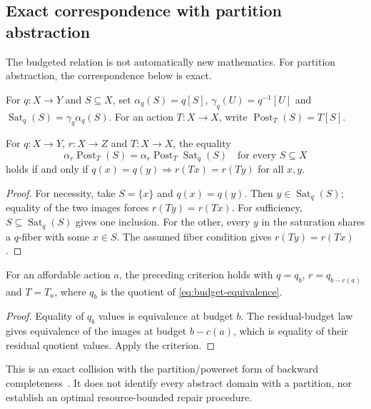 \subsection{Exact correspondence with partition abstraction}

The budgeted relation is not automatically new mathematics. For
partition abstraction, the correspondence below is exact.

For $q:X\to Y$ and $S\subseteq X$, set
$\alpha_q(S)=q[S]$, $\gamma_q(U)=q^{-1}[U]$ and
$\operatorname{Sat}_q(S)=\gamma_q\alpha_q(S)$.
For an action $T:X\to X$, write $\operatorname{Post}_T(S)=T[S]$.

\begin{theorem}
\label{thm:partition-completeness}
For $q:X\to Y$, $r:X\to Z$ and $T:X\to X$, the equality
\[
 \alpha_r\operatorname{Post}_T(S)
  =\alpha_r\operatorname{Post}_T\operatorname{Sat}_q(S)
 \quad\text{for every }S\subseteq X
\]
holds if and only if
$q(x)=q(y)\Rightarrow r(Tx)=r(Ty)$ for all $x,y$.
\end{theorem}
\begin{proof}
For necessity, take $S=\{x\}$ and $q(x)=q(y)$.
Then $y\in\operatorname{Sat}_q(S)$; equality of the two images
forces $r(Ty)=r(Tx)$. For sufficiency, $S\subseteq
\operatorname{Sat}_q(S)$ gives one inclusion. For the other, every
$y$ in the saturation shares a $q$-fiber with some $x\in S$.
The assumed fiber condition gives $r(Ty)=r(Tx)$.
\end{proof}

\begin{corollary}
\label{cor:budget-completeness}
For an affordable action $a$, the preceding criterion holds with
$q=q_b$, $r=q_{b-c(a)}$ and $T=T_a$, where $q_b$ is the quotient
of \eqref{eq:budget-equivalence}.
\end{corollary}
\begin{proof}
Equality of $q_b$ values is equivalence at budget $b$. The residual-budget
law gives equivalence of the images at budget $b-c(a)$, which is equality
of their residual quotient values. Apply the criterion.
\end{proof}
This is an exact collision with the partition/powerset form of
backward completeness~\cite{giacobazzi2000making}. It does not
identify every abstract domain with a partition, nor establish an
optimal resource-bounded repair procedure.
